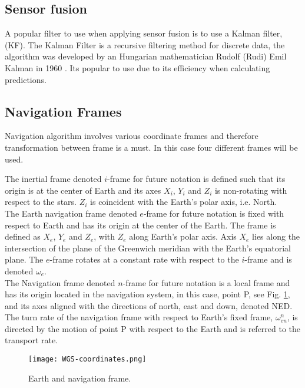 \subsection{Sensor fusion}
A popular filter to use when applying sensor fusion is to use a Kalman filter, (KF). The Kalman Filter is a recursive filtering method for discrete data, the algorithm was developed by an Hungarian mathematician Rudolf (Rudi) Emil Kalman in 1960 \cite{boken}. Its popular to use due to its efficiency when calculating predictions. \cite{kf eff}

\subsection*{Navigation Frames}
Navigation algorithm involves various coordinate frames and therefore transformation between frame is a must. In this case four different frames will be used.

The inertial frame denoted $i$-frame for future notation is defined such that its origin is at the center of Earth and its axes $X_i$, $Y_i$ and $Z_i$ is non-rotating with respect to the stars. $Z_i$ is coincident with the Earth's polar axis, i.e. North.\\

The Earth navigation frame denoted $e$-frame for future notation is fixed with respect to Earth and has its origin at the center of the Earth. The frame is defined as $X_e$, $Y_e$ and $Z_e$, with $Z_e$ along Earth's polar axis. Axis $X_e$ lies along the intersection of the plane of the Greenwich meridian with the Earth's equatorial plane. The $e$-frame rotates at a constant rate with respect to the $i$-frame and is denoted $\omega_e$.\\

The Navigation frame denoted $n$-frame for future notation is a local frame and has its origin located in the navigation system, in this case, point P, see Fig. \ref{WGS}, and its axes aligned with the directions of north, east and down, denoted NED. The turn rate of the navigation frame with respect to Earth's fixed frame, $\omega_{en}^n$, is directed by the motion of point P with respect to the Earth and is referred to the transport rate.   

\begin{figure}[H]
\centering
\texttt{[image: WGS-coordinates.png]}
\caption{Earth and navigation frame.}
\label{WGS}
\end{figure}


